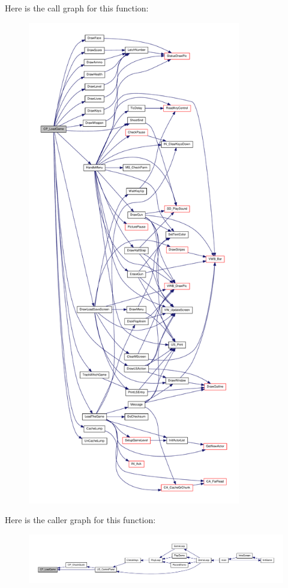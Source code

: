 Here is the call graph for this function:
\nopagebreak
\begin{figure}[H]
\begin{center}
\leavevmode
\includegraphics[height=600pt]{WL__MENU_8H_a2ca12f5b43c80ee49b36a78621ac8ce4_cgraph}
\end{center}
\end{figure}




Here is the caller graph for this function:
\nopagebreak
\begin{figure}[H]
\begin{center}
\leavevmode
\includegraphics[width=400pt]{WL__MENU_8H_a2ca12f5b43c80ee49b36a78621ac8ce4_icgraph}
\end{center}
\end{figure}


